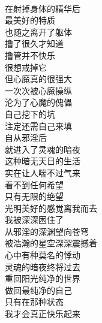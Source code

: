 \begin{poem}[灵魂的暗夜]
    \begin{multicols}{2}
        \begin{center}~\\
            在射掉身体的精华后 \\ 最美好的特质 \\ 也随之离开了躯体 \\ 撸了很久才知道 \\ 撸管并不快乐 \\ 很想戒掉它 \\ 但心魔真的很强大 \\ 一次次被心魔操纵 \\ 沦为了心魔的傀儡 \\ 自己挖下的坑 \\ 注定还需自己来填 \\ 自从邪淫后 \\ 就进入了灵魂的暗夜 \\ 这种暗无天日的生活 \\ 实在让人喘不过气来 \\ 看不到任何希望 \\ 只有无限的绝望 \\ 光明美好的感觉离我而去 \\ 我被深深困住了 \\ 从邪淫的深渊望向苍穹 \\ 被浩瀚的星空深深震撼着 \\ 心中有种莫名的悸动 \\ 灵魂的暗夜终将过去 \\ 重回阳光纯净的世界 \\ 做回最纯净的自己 \\ 只有在那种状态 \\ 我才会真正快乐起来
        \end{center}
    \end{multicols}
\end{poem}

